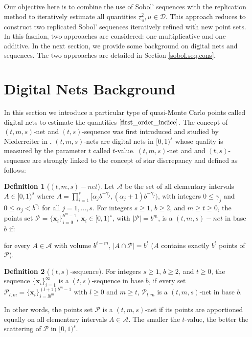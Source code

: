 \documentclass[]{elsarticle}
\theoremstyle{definition}
\newtheorem{defin}{Definition}
\newcommand{\cubes}{[0,1)^s}
\newcommand{\bvec}[1]{\boldsymbol{#1}}
\newcommand{\vx}{\bvec{x}}
\begin{document}
Our objective here is to combine the use of Sobol' sequences \cite{sobolseq} with the replication method to iteratively estimate all quantities $\underline{\tau}_u^2, u \in \mathcal{D}$. This approach reduces to construct two replicated Sobol' sequences iteratively refined with new point sets. In this fashion, two approaches are considered: one multiplicative and one additive. In the next section, we provide some background on digital nets and sequences. The two approaches are detailed in Section \ref{sobol.seq.cons}.

\section{Digital Nets Background}

In this section we introduce a particular type of quasi-Monte Carlo points called digital nets to estimate the quantities $\eqref{first_order_indice}$. 
 The concept of $(t,m,s)$-net and $(t,s)$-sequence was first introduced and studied by Niederreiter in \cite{niederreiter}. $(t,m,s)$-nets are digital nets in $\cubes$ whose quality is measured by the parameter $t$ called $t$-value. %
 $(t,m,s)$-net and and $(t,s)$-sequence are strongly linked to the concept of star discrepancy \cite{star} and defined as follows:
\begin{defin}[$(t,m,s)-net$]
Let $\mathcal{A}$ be the set of all elementary intervals $A\in\cubes$ where $A=\prod_{i=1}^s [\alpha_jb^{-\gamma_j},(\alpha_j+1)b^{-\gamma_j})$, with integers $0\leq\gamma_j$ and $0\leq\alpha_j<b^{\gamma_j}$ for all $j=1,\dots,s$. For integers $s\geq 1$, $b\geq 2$, and $m\geq t\geq 0$, the points set $\mathcal{P}=\{\vx_i\}_{i=0}^{b^m-1}$, $\vx_i\in\cubes$, with $|\mathcal{P}|=b^m$, is a $(t,m,s)-net$ in base $b$ if:

for every $A\in\mathcal{A}$ with volume $b^{t-m}$, $|A\cap\mathcal{P}|=b^t$ ($A$ contains exactly $b^t$ points of $\mathcal{P}$).
\end{defin}
\begin{defin}[$(t,s)$-sequence]
For integers $s\geq 1$, $b\geq 2$, and $t\geq 0$, the sequence $\{\vx_i\}_{i=1}^{\infty}$ is a $(t,s)$-sequence in base $b$, if every set $\mathcal{P}_{l,m}=\{\vx_i\}_{i=lb^m}^{(l+1)b^m-1}$ with $l\geq 0$ and $m\geq t$, $\mathcal{P}_{l,m}$ is a $(t,m,s)$-net in base $b$.
\end{defin}
In other words, the points set $\mathcal{P}$ is a $(t,m,s)$-net if its points are apportioned equally on all elementary intervals $A\in\mathcal{A}$. The smaller the $t$-value, the better the scattering of $\mathcal{P}$ in $\cubes$.
\bigskip
\end{document}

